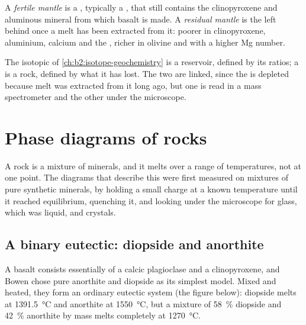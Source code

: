 \begin{definition}\label{def:b2:mantle-melting:fertility}
A \emph{fertile mantle} is a , typically a
, that still contains the clinopyroxene and aluminous mineral from
which basalt is made. A \emph{residual mantle} is the
 left behind once a melt has been extracted from it: poorer in
clinopyroxene, aluminium, calcium and the , richer in
olivine and with a higher Mg number.
\end{definition}

The isotopic  of \cref{ch:b2:isotope-geochemistry} is a reservoir,
defined by its ratios; a  is a rock, defined by what it has lost.
The two are linked, since the  is depleted because melt was
extracted from it long ago, but one is read in a mass spectrometer and the other
under the microscope.

\section{Phase diagrams of rocks}\label{sec:b2:mantle-melting:diagrams}

A rock is a mixture of minerals, and it melts over a range of temperatures, not at
one point. The diagrams that describe this were first measured on mixtures of
pure synthetic minerals, by holding a small charge at a known temperature until it
reached equilibrium, quenching it, and looking under the microscope for glass,
which was liquid, and crystals.

\subsection*{A binary eutectic: diopside and anorthite}

A basalt consists essentially of a calcic plagioclase and a clinopyroxene, and
Bowen chose pure anorthite and diopside as its simplest model. Mixed and heated,
they form an ordinary eutectic
system (the figure below): diopside melts at \qty{1391.5}{\celsius} and anorthite
at \qty{1550}{\celsius}, but a mixture of \qty{58}{\percent} diopside and
\qty{42}{\percent} anorthite by mass melts completely at \qty{1270}{\celsius}.

